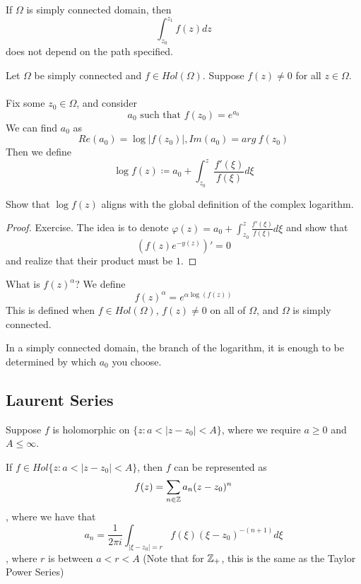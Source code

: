 \begin{remark}
If $\Omega$ is simply connected domain, then
\[\int_{z_0}^{z_1} f(z) dz\]
does not depend on the path specified.
\end{remark}

\begin{definition}
    Let $\Omega$ be simply connected and $f \in Hol(\Omega)$. Suppose $f(z) \neq 0$ for all $z \in \Omega$.\\\\
    Fix some $z_0 \in \Omega$, and consider
    \[a_0 \text{ such that } f(z_0) = e^{a_0}\]
    We can find $a_0$ as
    \[Re(a_0) = \log |f(z_0)|, Im(a_0) = arg\ f(z_0)\]
    Then we define
    \[\log f(z) \coloneqq a_0 + \int_{z_0}^z \frac{f'(\xi)}{f(\xi)} d\xi\]
\end{definition}

Show that $\log f(z)$ aligns with the global definition of the complex logarithm.

\begin{proof}
Exercise. The idea is to denote $\varphi(z) = a_0 + \int_{z_0}^z \frac{f'(\xi)}{f(\xi)} d\xi$ and show that
\[(f(z) e^{-y(z)})' = 0\]
and realize that their product must be $1$.
\end{proof}

\begin{definition}
    What is $f(z)^{\alpha}$? We define
    \[f(z)^{\alpha} = e^{\alpha \log(f(z))}\]
    This is defined when $f \in Hol(\Omega)$, $f(z) \neq 0$ on all of $\Omega$, and $\Omega$ is simply connected.
\end{definition}

In a simply connected domain, the branch of the logarithm, it is enough to be determined by which $a_0$ you choose.

\subsection{Laurent Series}

Suppose $f$ is holomorphic on $\{z : a < |z - z_0| < A\}$, where we require $a \geq 0$ and $A \leq \infty$.

\begin{theorem}
If $f \in Hol\{z : a < |z - z_0| < A\}$, then $f$ can be represented as
\[f(z) = \sum_{n \in \mathbb{Z}} a_n (z - z_0)^n\]
, where we have that
\[a_n = \frac{1}{2\pi i} \int_{|\xi - z_0| = r} f(\xi) (\xi - z_0)^{-(n+1)} d\xi\]
, where $r$ is between $a < r < A$ (Note that for $\mathbb{Z}_+$, this is the same as the Taylor Power Series)
\end{theorem}


